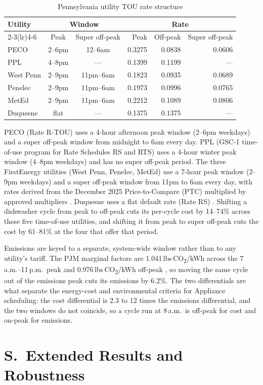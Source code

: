 \documentclass[11pt]{article}
\newcounter{suppsectioncounter}
\newcommand{\suppsection}[1]{%
  \stepcounter{suppsectioncounter}%
  \section*{S\thesuppsectioncounter.\ #1}%
  \setcounter{table}{0}\setcounter{figure}{0}\setcounter{equation}{0}%
  \setcounter{section}{\value{suppsectioncounter}}\setcounter{subsection}{0}%
  \renewcommand{\theHtable}{S\thesuppsectioncounter.\arabic{table}}%
  \renewcommand{\theHfigure}{S\thesuppsectioncounter.\arabic{figure}}%
}
\begin{document}
\begin{table}[htbp]
\small
\centering
\renewcommand{\arraystretch}{1.15}
\caption{Pennsylvania utility TOU rate structure}
\label{tab:tou_rates}
\begin{tabular}{@{}l cc rrr@{}}
\toprule
\textbf{Utility} & \multicolumn{2}{c}{\textbf{Window}} & \multicolumn{3}{c}{\textbf{Rate}} \\
\cmidrule(lr){2-3}\cmidrule(lr){4-6}
 & Peak & Super off-peak & Peak & Off-peak & Super off-peak \\
\midrule
PECO       & 2--6pm  & 12--6am & 0.3275 & 0.0838 & 0.0606 \\
PPL        & 4--8pm  & ---     & 0.1399 & 0.1199 & --- \\
West Penn  & 2--9pm  & 11pm--6am & 0.1823 & 0.0935 & 0.0689 \\
Penelec    & 2--9pm  & 11pm--6am & 0.1973 & 0.0996 & 0.0765 \\
MetEd      & 2--9pm  & 11pm--6am & 0.2212 & 0.1089 & 0.0806 \\
Duquesne   & flat    & ---     & 0.1375 & 0.1375 & --- \\
\bottomrule
\end{tabular}
\renewcommand{\arraystretch}{1.0}
\end{table}

PECO (Rate R-TOU) \citep{peco2021,peco2025tou} uses a 4-hour afternoon peak window (2--6pm weekdays) and a super off-peak window from midnight to 6am every day. PPL (GSC-1 time-of-use program for Rate Schedules RS and RTS) \citep{ppl2025supp402,ppl2025ptc} uses a 4-hour winter peak window (4--8pm weekdays) and has no super off-peak period. The three FirstEnergy utilities (West Penn, Penelec, MetEd) use a 7-hour peak window (2--9pm weekdays) and a super off-peak window from 11pm to 6am every day, with rates derived from the December 2025 Price-to-Compare (PTC) multiplied by approved multipliers \citep{fepa_supp28,fepa_supp20}. Duquesne uses a flat default rate (Rate RS) \citep{duquesne2026,paupc2025dec}. Shifting a dishwasher cycle from peak to off-peak cuts its per-cycle cost by 14--74\% across these five time-of-use utilities, and shifting it from peak to super off-peak cuts the cost by 61--81\% at the four that offer that period.

Emissions are keyed to a separate, system-wide window rather than to any utility's tariff. The PJM marginal factors are 1.041\,lbs\,CO\textsubscript{2}/kWh across the 7\,a.m.--11\,p.m.\ peak and 0.976\,lbs\,CO\textsubscript{2}/kWh off-peak \citep{pjm2022emissions}, so moving the same cycle out of the emissions peak cuts its emissions by 6.2\%. The two differentials are what separate the energy-cost and environmental criteria for Appliance scheduling: the cost differential is 2.3 to 12 times the emissions differential, and the two windows do not coincide, so a cycle run at 8\,a.m.\ is off-peak for cost and on-peak for emissions.
\suppsection{Extended Results and Robustness}
\end{document}
